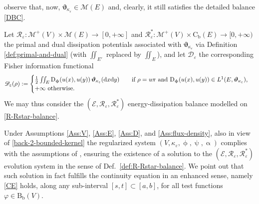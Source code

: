 \documentclass[11pt,reqno]{amsart}
\numberwithin{equation}{section}
\newcommand{\ENHCE}[2]{\calC \calE^{\mathrm{enh}}([#1,#2])}
\newcommand{\R}{\mathbb{R}}
\newcommand{\calC}{\mathcal{C}}
\newcommand{\calE}{\mathcal{E}}
\newcommand{\calM}{\mathcal{M}}
\newcommand{\eps}{\varepsilon}
\newcommand{\dd}{\mathrm{d}}
\theoremstyle{definition}
\newtheorem{definition}[theorem]{Definition}
\newcommand{\ep}{\varepsilon}
\let\eps\ep
\def\dd{\mathrm{d}}
\newcommand{\Cb}{\mathrm{C}_{\mathrm{b}}}
\newcommand{\Bb}{\mathrm{B}_{\mathrm b}}
\newcommand{\Fish}{\mathscr{D}}
\newcommand{\teta}{\boldsymbol \vartheta}
\newcommand{\tetapie}{\boldsymbol{\teta}_{\kappa_\eps}}
\newcommand{\scrR}{\mathscr{R}}
\newcommand{\scrD}{\mathscr{D}}
\newcommand{\scrE}{\mathscr{E}}
\newcommand{\jj}{{\boldsymbol{j}}}
\newcommand{\Ed}{{E'}}
\newcommand{\RNEW}{\color{black}} %
\newcommand{\EEE}{\color{black}}
\numberwithin{equation}{section}
\begin{document}
 observe that, now, $\tetapie \in \calM(E)$ and, clearly, it still satisfies the detailed balance \eqref{DBC}. 
\par
Let $\scrR_\eps: \calM^+(V) \times \calM(E) \to [0,+\infty]$ and $\scrR_\eps^*  : \calM^+(V)\times \Cb(E) \to [0,+\infty)$  the primal and dual  dissipation potentials associated with $\tetapie$ via Definition \ref{def:primal-and-dual}
(with  $\iint_{\Ed}$ replaced  by $\iint_{E}$), and let $\scrD_\eps$ the corresponding Fisher information functional 
\RNEW
\[
\Fish_\eps(\rho): = 
\begin{cases}
\frac12 \iint_{E}  \mathrm{D}_\upphi(u(x),u(y)) \, \tetapie(\dd x \dd y) \qquad \text{if  } \rho = u \pi \text{ and  $ \mathrm{D}_\upphi(u(x),u(y)) \in L^1(E,\tetapie)$,}
\\
+\infty \text{ otherwise.}
\end{cases} 
\]
\EEE
We may thus consider the $(\scrE,\scrR_\eps,\scrR_\eps^*)$ energy-dissipation balance
modelled on \eqref{R-Rstar-balance}. 
\par
Under  Assumptions \ref{Ass:V},  \ref{Ass:E},   \ref{Ass:D},  and \ref{Ass:flux-density}, also 
in view of \eqref{back-2-bounded-kernel} 
 the  regularized  system $(V,\kappa_\eps,\upphi,\uppsi,\upalpha)$ complies with the assumptions of \cite[Thm.\ 5.7]{PRST22},
  ensuring the existence of 
a  solution to the   $(\scrE,\scrR_\eps,\scrR_\eps^*)$ evolution system in the sense of Def.\ \ref{def:R-Rstar-balance}. 
We point out that such solution in fact fulfills the continuity equation in an enhanced   sense, 
namely  \eqref{CE} holds, along any sub-interval $ [s,t]\subset [a,b]$, for all test functions $\varphi \in \Bb(V)$. 
\end{document}
